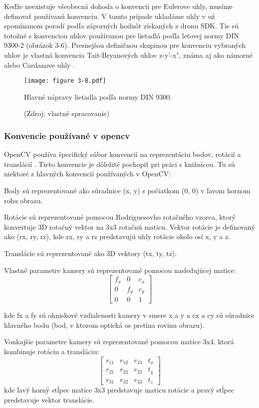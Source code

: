 {Keďže neexistuje všeobecná dohoda o konvencii pre Eulerove uhly, musíme definovať používanú konvenciu. V tomto prípade ukladáme uhly v už spomínanom poradí podľa záporných hodnôt získaných z dronu SDK. Tie sú totožné s konvenciou uhlov používanou pre lietadlá podľa letovej normy DIN 9300-2 (obrázok 3-6). Presnejšou definičnou skupinou pre konvenciu vybraných uhlov je vlastná konvencia Tait-Bryanových uhlov z-y'-x", známa aj ako námorné alebo Cardanove uhly \citep{DIN9300-2}.
\begin{figure}[ht!]
    \centering
    \texttt{[image: figure 3-8.pdf]}
    \caption{Hlavné nápravy lietadla podľa normy DIN 9300.}
    \captionsetup{font=footnotesize, justification=centering, skip=5pt}
    \caption*{(Zdroj: vlastné spracovanie)}
    \label{o:3-8} 
\end{figure} 

\subsubsection{Konvencie používané v opencv}
OpenCV používa špecifický súbor konvencií na reprezentáciu bodov, rotácií a translácií \citep{opencv_calib3d}. Tieto konvencie je dôležité pochopiť pri práci s knižnicou. Tu sú niektoré z hlavných konvencií používaných v OpenCV:

Body sú reprezentované ako súradnice (x, y) s počiatkom (0, 0) v ľavom hornom rohu obrazu.

Rotácie sú reprezentované pomocou Rodriguesovho rotačného vzorca, ktorý konvertuje 3D rotačný vektor na 3x3 rotačnú maticu. Vektor rotácie je definovaný ako (rx, ry, rz), kde rx, ry a rz predstavujú uhly rotácie okolo osí x, y a z.

Translácie sú reprezentované ako 3D vektory (tx, ty, tz).

Vlastné parametre kamery sú reprezentované pomocou nasledujúcej matice:
\begin{equation}
\begin{bmatrix}
f_x & 0 & c_x \\
0 & f_y & c_y \\
0 & 0 & 1
\end{bmatrix}
\end{equation}

kde fx a fy sú ohniskové vzdialenosti kamery v smere x a y a cx a cy sú súradnice hlavného bodu (bod, v ktorom optická os pretína rovinu obrazu).

Vonkajšie parametre kamery sú reprezentované pomocou matice 3x4, ktorá kombinuje rotáciu a transláciu:
\begin{equation}
\begin{bmatrix}
r_{11} & r_{12} & r_{13} & t_x \\
r_{21} & r_{22} & r_{23} & t_y \\
r_{31} & r_{32} & r_{33} & t_z
\end{bmatrix}
\end{equation}
kde ľavý horný stĺpec matice 3x3 predstavuje maticu rotácie a pravý stĺpec predstavuje vektor translácie.

}
